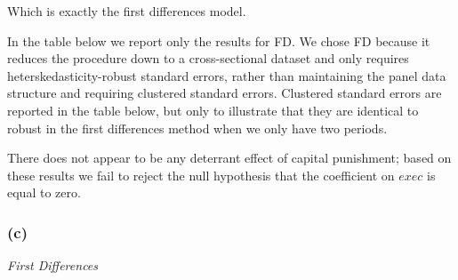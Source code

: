 \documentclass[
]{article}
\begin{document}
Which is exactly the first differences model.

In the table below we report only the results for FD. We chose FD
because it reduces the procedure down to a cross-sectional dataset and
only requires heterskedasticity-robust standard errors, rather than
maintaining the panel data structure and requiring clustered standard
errors. Clustered standard errors are reported in the table below, but
only to illustrate that they are identical to robust in the first
differences method when we only have two periods.

There does not appear to be any deterrant effect of capital punishment;
based on these results we fail to reject the null hypothesis that the
coefficient on \(exec\) is equal to zero.

\hypertarget{c}{%
\subsubsection{(c)}\label{c}}

\emph{First Differences}
\end{document}
